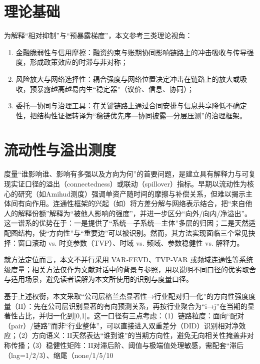\section{理论基础}
为解释“相对抑制”与“预暴露梯度”，本文参考三类理论视角：
\begin{enumerate}
  \item 金融脆弱性与信用摩擦：融资约束与账期协同影响链路上的冲击吸收与传导强度，形成政策效应的时滞与非对称；
  \item 风险放大与网络选择性：耦合强度与网络位置决定冲击在链路上的放大或吸收，预暴露越高越易内生“稳定器”（议价、信息、协同）；
  \item 委托—协同与治理工具：在关键链路上通过合同安排与信息共享降低不确定性，把结构性证据转译为“稳链优先序—协同披露—分层压测”的治理框架。
\end{enumerate}

\section{流动性与溢出测度}
度量“谁影响谁、影响有多强以及方向为何”的首要问题，是建立具有解释力与可复现实证口径的溢出（connectedness）或联动（spillover）指标。早期以流动性为核心的研究（如Amihud测度）强调单资产随时间的摩擦与补偿关系，但难以揭示主体间有向作用。连通性框架的兴起（如\citep{billio2012econometric,diebold2012better,diebold2014connectedness}）将方差分解与网络表示结合，把“来自他人的解释份额”解释为“被他人影响的强度”，并进一步区分“向外/向内/净溢出”。这一谱系的优势在于：一是提供了“系统—子系统—主体”多层的归因；二是天然适配图结构，使“方向性”与“重要边”可以被识别。然而，其方法实现面临三个常见抉择：窗口滚动 vs. 时变参数（TVP）、时域 vs. 频域、参数稳健性 vs. 解释力。

就方法定位而言，本文不并行采用 VAR‑FEVD、TVP‑VAR 或频域连通性等系统级度量；相关方法仅作为文献对话中的背景与参照，用以说明不同口径的优劣取舍与适用场景，避免读者误解为本文所使用的识别与度量口径。

基于上述权衡，本文采取“公司层格兰杰显著性→行业配对归一化”的方向性强度度量（II）：先在公司层识别显著的有向预测关系，再按行业聚合为“i→j”在当期的显著性占比，并归一化到[0,1]。这一口径有三点考虑：（1）链路粒度：面向“配对（pair）/链路”而非“行业整体”，可以直接进入双重差分（DID）识别相对净效应；（2）方向语义：II天然表达“谁到谁”的当期方向性，避免无向相关性掩盖非对称传播；（3）稳健性矩阵：II对滞后阶、阈值与极端值处理敏感，需配套“滞后（lag=1/2/3）、缩尾（none/1/5/10%

